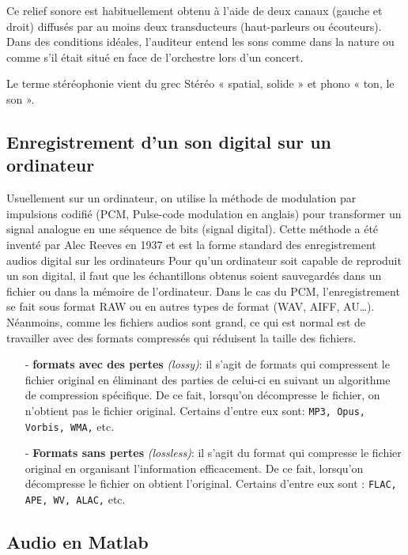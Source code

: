 \documentclass[conference,onecolumn]{IEEEtran}
\begin{document}
Ce relief sonore est habituellement obtenu à l'aide de deux canaux (gauche et droit) diffusés par au moins deux transducteurs (haut-parleurs ou écouteurs). Dans des conditions idéales, l'auditeur entend les sons comme dans la nature ou comme s'il était situé en face de l'orchestre lors d'un concert.

Le terme stéréophonie vient du grec Stéréo « spatial, solide » et phono « ton, le son ».

\subsection{Enregistrement d'un son digital sur un ordinateur}
Usuellement sur un ordinateur, on utilise la méthode de modulation par impulsions codifié (PCM, Pulse-code modulation en anglais) pour transformer un signal analogue en une séquence de bits (signal digital). Cette méthode a été inventé par Alec Reeves en 1937 et est la forme standard des enregistrement audios digital sur les ordinateurs
Pour qu’un ordinateur soit capable de reproduit un son digital, il faut que les échantillons obtenus soient sauvegardés dans un fichier ou dans la mémoire de l’ordinateur. Dans le cas du PCM, l’enregistrement se fait sous format RAW ou en autres types de format (WAV, AIFF, AU…). Néanmoins, comme les fichiers audios sont grand, ce qui est normal est de travailler avec des formats compressés qui réduisent la taille des fichiers.

\begin{itemize} %

    \item[-] \textbf{formats avec des pertes} \textit{(lossy)}:  il s’agit de formats qui compressent le fichier original en éliminant des parties de celui-ci en suivant un algorithme de compression spécifique. De ce fait, lorsqu’on décompresse le fichier, on n’obtient pas le fichier original. Certains d’entre eux sont: \texttt{MP3, Opus, Vorbis, WMA,} etc.
    \item[-] \textbf{Formats sans pertes} \textit{(lossless)}: il s’agit du format qui compresse le fichier original en organisant l’information efficacement. De ce fait, lorsqu’on décompresse le fichier on obtient l’original. Certains d’entre eux sont : \texttt{FLAC, APE, WV, ALAC,} etc.

\end{itemize}

\subsection{Audio en Matlab}
\end{document}
